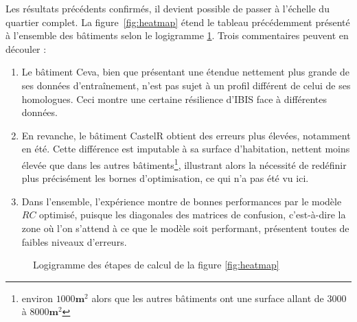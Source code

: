             Les résultats précédents confirmés, il devient possible de passer à l'échelle du quartier complet.
            La figure~\ref{fig:heatmap} étend le tableau précédemment présenté à l'ensemble des bâtiments selon le logigramme \ref{fig:logigrammemebm}.
            Trois commentaires peuvent en découler :
            \begin{enumerate}
                \item Le bâtiment Ceva, bien que présentant une étendue nettement plus grande de ses données d'entraînement, n'est pas sujet à un profil différent de celui de ses homologues.
                Ceci montre une certaine résilience d'IBIS face à différentes données.
                \item En revanche, le bâtiment CastelR obtient des erreurs plus élevées, notamment en été.
                Cette différence est imputable à sa surface d'habitation, nettent moins élevée que dans les autres bâtiments\footnote{environ $1000\mathbf m^2$ alors que les autres bâtiments ont une surface allant de $3000$ à $8000\mathbf m^2$}, illustrant alors la nécessité de redéfinir plus précisément les bornes d'optimisation, ce qui n'a pas été vu ici.
                \item Dans l'ensemble, l'expérience montre de bonnes performances par le modèle $RC$ optimisé, puisque les diagonales des matrices de confusion, c'est-à-dire la zone où l'on s'attend à ce que le modèle soit performant, présentent toutes de faibles niveaux d'erreurs.
            \end{enumerate}

            \begin{figure}[H]
                \centering
                \fbox{}
                \caption{Logigramme des étapes de calcul de la figure \ref{fig:heatmap}}\label{fig:logigrammemebm}
            \end{figure}


